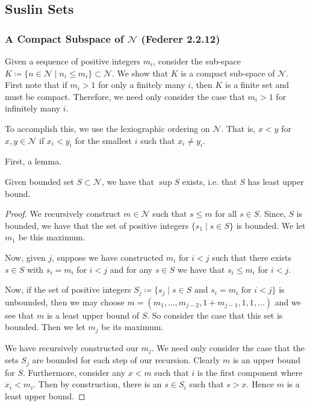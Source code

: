 \subsection{Suslin Sets}

\subsubsection{A Compact Subspace of \(\mathcal N\) (Federer 2.2.12)}

Given a sequence of positive integers \(m_i\), consider the sub-space
\(K \coloneqq \{n \in \mathcal N \mid n_i \leq m_i\} \subset \mathcal N\). We show that \(K\) is a compact
sub-space of \(\mathcal N\). First note that if \(m_i > 1\) for only a finitely many \(i\), then \(K\) is a finite
set and must be compact. Therefore, we need only consider the case that \(m_i > 1\) for infinitely many  \(i\).

To accomplish this, we use the lexiographic ordering on \(\mathcal N\). That is, \(x < y\) for
\(x, y \in \mathcal N\) if \(x_i < y_i\) for the smallest \(i\) such that \(x_i \neq y_i\).

First, a lemma. 
\begin{lemma}
Given bounded set \(S \subset \mathcal N\), we have that \(\sup S\) exists, i.e. that \(S\) has least
upper bound.
\end{lemma}
\begin{proof}
We recursively construct \(m \in \mathcal N\) such that \(s \leq m\) for all \(s \in S\). Since, \(S\) is
bounded, we have that the set of positive integers \(\{s_1 \mid s \in S\}\) is bounded. We let \(m_1\) be this
maximum. 

Now, given \(j\), suppose we have constructed \(m_i\) for \(i < j\) such that there exists \(s \in S\) with
\(s_i = m_i\) for \(i < j\) and for any \(s \in S\) we have that \(s_i \leq m_i\) for \(i < j\). 

Now, if the set of positive integers
\(S_j \coloneqq \{s_j \mid s \in S \text{ and } s_i = m_i \text{ for } i < j\}\) is unbounded, then we may choose 
\(m = (m_1,..., m_{j-2}, 1 + m_{j-1}, 1, 1, ...)\) and we see that \(m\) is a least upper bound of \(S\).
So consider the case that this set is bounded. Then we let \(m_j\) be its maximum.

We have recursively constructed our \(m_j\). We need only consider the case that the sets \(S_j\) are bounded
for each step of our recursion. Clearly \(m\) is an upper bound for \(S\). Furthermore, consider any \(x < m\)
such that \(i\) is the first component where \(x_i < m_i\). Then by construction, there is an \(s \in S_i\) such
that \(s > x\). Hence \(m\) is a least upper bound. 
\end{proof}

